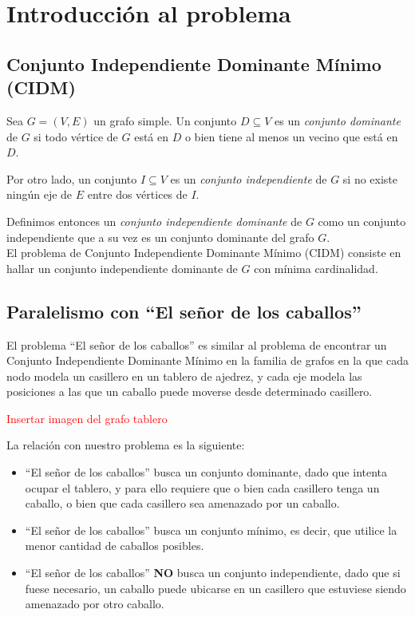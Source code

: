 \section{Introducci\'on al problema}
\subsection{Conjunto Independiente Dominante M\'inimo (CIDM)}

Sea $G = (V, E)$ un grafo simple. Un conjunto $D \subseteq V$ es un \emph{conjunto dominante} de $G$ si todo v\'ertice de $G$ est\'a en $D$ o bien tiene al menos un vecino que est\'a en $D$. 

Por otro lado, un conjunto $I \subseteq V$ es un \emph{conjunto independiente} de $G$ si no existe ning\'un eje de $E$ entre dos v\'ertices de $I$. 

Definimos entonces un \emph{conjunto independiente dominante} de $G$ como un conjunto independiente que a su vez es un conjunto dominante del grafo $G$.\\

El problema de Conjunto Independiente Dominante M\'inimo (CIDM) consiste en hallar un conjunto independiente dominante de $G$ con m\'inima cardinalidad.

\subsection{Paralelismo con ``El se\~nor de los caballos''}\label{caballitos}

El problema ``El se\~nor de los caballos'' es similar al problema de encontrar un Conjunto Independiente Dominante M\'inimo en la familia de grafos en la que cada nodo modela un casillero en un tablero de ajedrez, y cada eje modela las posiciones a las que un caballo puede moverse desde determinado casillero.

\textcolor{red}{Insertar imagen del grafo tablero}

La relación con nuestro problema es la siguiente:
\begin{itemize}
	\item ``El se\~nor de los caballos'' busca un conjunto dominante, dado que intenta ocupar el tablero, y para ello requiere que o bien cada casillero tenga un caballo, o bien que cada casillero sea amenazado por un caballo.
	\item ``El se\~nor de los caballos'' busca un conjunto m\'inimo, es decir, que utilice la menor cantidad de caballos posibles.
	\item ``El se\~nor de los caballos'' \textbf{NO} busca un conjunto independiente, dado que si fuese necesario, un caballo puede ubicarse en un casillero que estuviese siendo amenazado por otro caballo.
	
\end{itemize}

